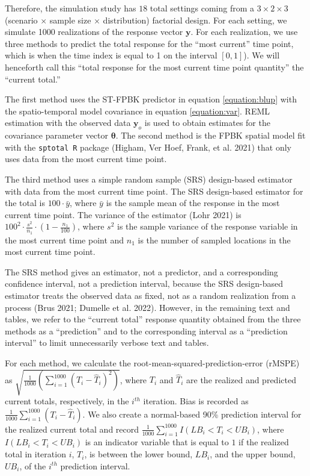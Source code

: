 \documentclass[smallextended]{svjour3}       %
\begin{document}
Therefore, the simulation study has \(18\) total settings coming from a
\(3 \times 2 \times 3\) (scenario \(\times\) sample size \(\times\)
distribution) factorial design. For each setting, we simulate 1000
realizations of the response vector \(\mathbf{y}\). For each
realization, we use three methods to predict the total response for the
``most current'' time point, which is when the time index is equal to 1
on the interval \([0, 1]\)). We will henceforth call this ``total
response for the most current time point quantity'' the ``current
total.''

The first method uses the ST-FPBK predictor in equation
\ref{equation:blup} with the spatio-temporal model covariance in
equation \ref{equation:var}. REML estimation with the observed data
\(\mathbf{y}_o\) is used to obtain estimates for the covariance
parameter vector \(\bm{\theta}\). The second method is the FPBK spatial
model fit with the \texttt{sptotal R} package (Higham, Ver Hoef, Frank,
et al. 2021) that only uses data from the most current time point.

The third method uses a simple random sample (SRS) design-based
estimator with data from the most current time point. The SRS
design-based estimator for the total is \(100 \cdot \bar{y}\), where
\(\bar{y}\) is the sample mean of the response in the most current time
point. The variance of the estimator (Lohr 2021) is
\(100^2 \cdot \frac{s^2}{n_1} \cdot (1 - \frac{n_1}{100})\), where
\(s^2\) is the sample variance of the response variable in the most
current time point and \(n_1\) is the number of sampled locations in the
most current time point.

The SRS method gives an estimator, not a predictor, and a corresponding
confidence interval, not a prediction interval, because the SRS
design-based estimator treats the observed data as fixed, not as a
random realization from a process (Brus 2021; Dumelle et al. 2022).
However, in the remaining text and tables, we refer to the ``current
total'' response quantity obtained from the three methods as a
``prediction'' and to the corresponding interval as a ``prediction
interval'' to limit unnecessarily verbose text and tables.

For each method, we calculate the root-mean-squared-prediction-error
(rMSPE) as
\(\sqrt{\frac{1}{1000}(\sum_{i = 1}^{1000}(T_i - \hat{T}_i)^2)}\), where
\(T_i\) and \(\hat{T}_i\) are the realized and predicted current totals,
respectively, in the \(i^{th}\) iteration. Bias is recorded as
\(\frac{1}{1000}\sum_{i = 1}^{1000}(T_i - \hat{T}_i)\). We also create a
normal-based 90\% prediction interval for the realized current total and
record \(\frac{1}{1000} \sum_{i = 1}^{1000}I(LB_i < T_i < UB_i)\), where
\(I(LB_i < T_i < UB_i)\) is an indicator variable that is equal to \(1\)
if the realized total in iteration \(i\), \(T_i\), is between the lower
bound, \(LB_i\), and the upper bound, \(UB_i\), of the \(i^{th}\)
prediction interval.
\end{document}
